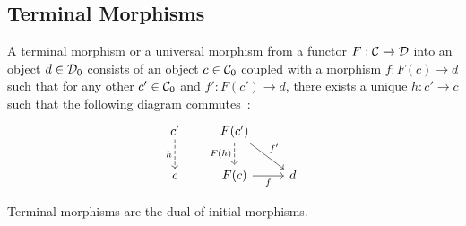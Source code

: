 \subsection{Terminal Morphisms}

\begin{definition}
	A terminal morphism or a universal morphism from a functor $F: \mathcal{C} \to \mathcal{D}$ into
	an object $d\in \mathcal{D}_0$ consists of an object $c\in \mathcal{C}_0$ coupled with a
	morphism $f: F(c) \to d$ such that for any other $c'\in \mathcal{C}_0$ and $f': F(c')
	\to d$, there exists a unique $h:c' \to c$ such that the following diagram
	commutes~\parencite[p.~58]{lane:working_mathematician}:
	\[\begin{tikzcd}[ampersand replacement=\&]
		{c'} \& {F(c')} \\
		c \& {F(c)} \& d
		\arrow["{F(h)}"', dashed, from=1-2, to=2-2]
		\arrow["{f'}", from=1-2, to=2-3]
		\arrow["f"', from=2-2, to=2-3]
		\arrow["h"', dashed, from=1-1, to=2-1]
	\end{tikzcd}\]
\end{definition}

\begin{remark}
	Terminal morphisms are the dual of initial morphisms.
\end{remark}

